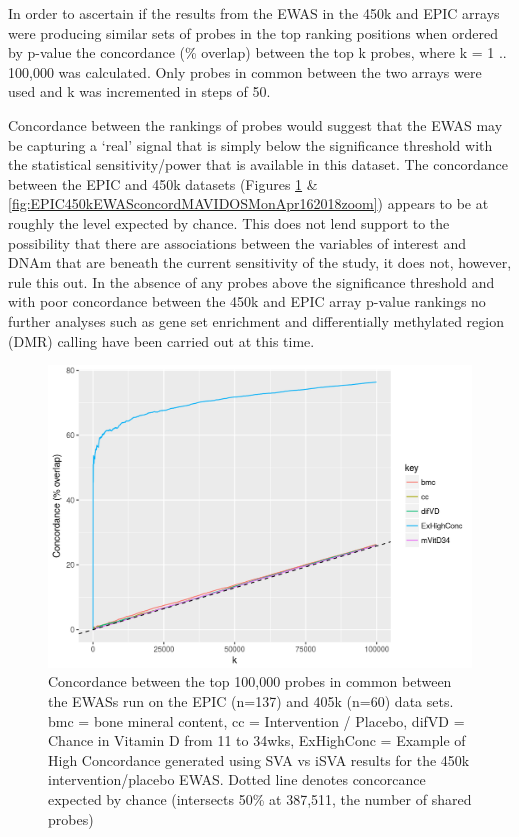 \documentclass[
]{book}
\begin{document}
In order to ascertain if the results from the EWAS in the 450k and EPIC arrays were producing similar sets of probes in the top ranking positions when ordered by p-value the concordance (\% overlap) between the top k probes, where k = 1 ..
100,000 was calculated.
Only probes in common between the two arrays were used and k was incremented in steps of 50.

Concordance between the rankings of probes would suggest that the EWAS may be capturing a `real' signal that is simply below the significance threshold with the statistical sensitivity/power that is available in this dataset.
The concordance between the EPIC and 450k datasets (Figures \ref{fig:EPIC450kEWASconcordMAVIDOSMonApr162018} \& \ref{fig:EPIC450kEWASconcordMAVIDOSMonApr162018zoom}) appears to be at roughly the level expected by chance.
This does not lend support to the possibility that there are associations between the variables of interest and DNAm that are beneath the current sensitivity of the study, it does not, however, rule this out.
In the absence of any probes above the significance threshold and with poor concordance between the 450k and EPIC array p-value rankings no further analyses such as gene set enrichment and differentially methylated region (DMR) calling have been carried out at this time.

\begin{figure}

{\centering \includegraphics[width=0.8\linewidth]{figs/EPIC450kEWASconcordMAVIDOSMonApr162018} 

}

\caption{Concordance between the top 100,000 probes in common between the EWASs run on the EPIC (n=137) and 405k (n=60) data sets. bmc = bone mineral content, cc = Intervention / Placebo, difVD = Chance in Vitamin D from 11 to 34wks, ExHighConc = Example of High Concordance generated using SVA vs iSVA results for the 450k intervention/placebo EWAS. Dotted line denotes concorcance expected by chance (intersects 50\% at 387,511, the number of shared probes)}\label{fig:EPIC450kEWASconcordMAVIDOSMonApr162018}
\end{figure}
\end{document}
